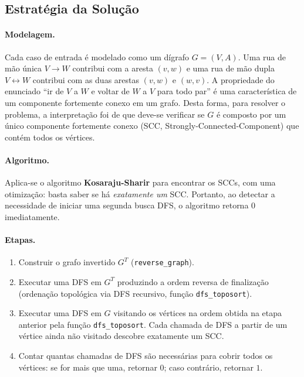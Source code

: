 \documentclass[11pt,a4paper]{article}
\begin{document}
\subsection{Estratégia da Solução}

\paragraph{Modelagem.} Cada caso de entrada é modelado como um dígrafo
$G=(V,A)$. Uma rua de mão única $V \to W$ contribui com a aresta
$(v,w)$ e uma rua de mão dupla $V \leftrightarrow W$ contribui com as duas arestas $(v,w)$ e $(w,v)$.
A propriedade do enunciado ``ir de $V$ a $W$ e voltar de $W$ a
$V$ para todo par'' é uma característica de 
um componente fortemente conexo em um grafo. Desta forma, para resolver o problema, a interpretação foi de que deve-se verificar se $G$ é composto por um
único componente fortemente conexo (SCC, Strongly-Connected-Component) que contém todos os
vértices.

\paragraph{Algoritmo.} Aplica-se o algoritmo
\textbf{Kosaraju-Sharir} para encontrar os SCCs, com uma otimização:
basta saber se há \emph{exatamente um} SCC. Portanto, ao detectar a
necessidade de iniciar uma segunda busca DFS, o
algoritmo retorna $0$ imediatamente.

\paragraph{Etapas.}
\begin{enumerate}
    \item Construir o grafo invertido $G^T$
    (\texttt{reverse\_graph}).
    \item Executar uma DFS em $G^T$ produzindo a ordem reversa de
    finalização (ordenação topológica via DFS recursivo, função
    \texttt{dfs\_toposort}).
    \item Executar uma DFS em $G$ visitando os vértices na ordem
    obtida na etapa anterior pela função \texttt{dfs\_toposort}. Cada chamada de DFS a partir de um vértice ainda não visitado descobre exatamente um SCC.
    \item Contar quantas chamadas de DFS são necessárias para cobrir
    todos os vértices: se for mais que uma, retornar $0$; caso
    contrário, retornar $1$.
\end{enumerate}
\end{document}
